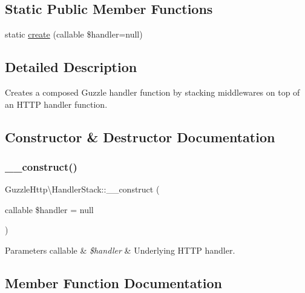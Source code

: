 \subsection*{Static Public Member Functions}
\begin{DoxyCompactItemize}
\item 
static \hyperlink{classGuzzleHttp_1_1HandlerStack_a8da30fb5d824c98e4f2ec402cb7b44ac}{create} (callable \$handler=null)
\end{DoxyCompactItemize}


\subsection{Detailed Description}
Creates a composed Guzzle handler function by stacking middlewares on top of an H\+T\+TP handler function. 

\subsection{Constructor \& Destructor Documentation}
\mbox{\label{classGuzzleHttp_1_1HandlerStack_acd991cc07f50dbb5ca301f703c11338f}} 
\subsubsection{\texorpdfstring{\+\_\+\+\_\+construct()}{\_\_construct()}}
{\footnotesize\ttfamily Guzzle\+Http\textbackslash{}\+Handler\+Stack\+::\+\_\+\+\_\+construct (\begin{DoxyParamCaption}\item[{callable}]{\$handler = {\ttfamily null} }\end{DoxyParamCaption})}


\begin{DoxyParams}[1]{Parameters}
callable & {\em \$handler} & Underlying H\+T\+TP handler. \\
\hline
\end{DoxyParams}


\subsection{Member Function Documentation}
\mbox{\label{classGuzzleHttp_1_1HandlerStack_a96c996cb646ff14c1e9302ffed3dde54}} 
